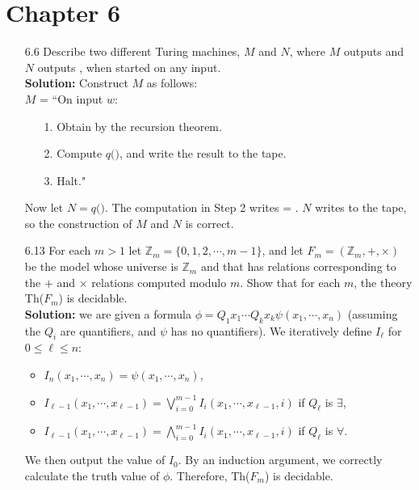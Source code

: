 \section{Chapter 6}
\begin{enumerate}
\item[6.6]Describe two different Turing machines, $M$ and $N$, where $M$ outputs  and $N$ outputs , when started on any input.
\\
\textbf{Solution:} Construct $M$ as follows:
\\
$M$ = ``On input $w$:
\begin{enumerate}
\itemsep0em
\item[1.]Obtain  by the recursion theorem.
\item[2.]Compute $q($$)$, and write the result to the tape.
\item[3.]Halt."
\end{enumerate}
Now let $N = q($$)$. The computation in Step 2 writes  = . $N$ writes  to the tape, so the construction of $M$ and $N$ is correct.

\item[6.13]For each $m > 1$ let $\mathbb{Z}_m = \{0,1,2,\cdots,m-1\}$, and let $F_m = (\mathbb{Z}_m, +, \times)$ be the model whose universe is $\mathbb{Z}_m$ and that has relations corresponding to the $+$ and $\times$ relations computed modulo $m$. Show that for each $m$, the theory Th($F_m$) is decidable.
\\
\textbf{Solution:} we are given a formula $\phi = Q_1x_1\cdots Q_kx_k \psi(x_1, \cdots, x_n)$ (assuming the $Q_i$ are quantifiers, and $\psi$ has no quantifiers). We iteratively define $I_\ell$ for $0 \le \ell \le n$:
\begin{itemize}
\item $I_n(x_1, \cdots, x_n) = \psi(x_1, \cdots, x_n)$,
\item $I_{\ell-1}(x_1, \cdots, x_{\ell-1}) = \bigvee_{i=0}^{m-1} I_{i}(x_1, \cdots, x_{\ell-1}, i)$ if $Q_\ell$ is $\exists$,
\item $I_{\ell-1}(x_1, \cdots, x_{\ell-1}) = \bigwedge_{i=0}^{m-1} I_{i}(x_1, \cdots, x_{\ell-1}, i)$ if $Q_\ell$ is $\forall$.
\end{itemize}
We then output the value of $I_0$. By an induction argument, we correctly calculate the truth value of $\phi$. Therefore, Th($F_m$) is decidable. 



\end{enumerate}
